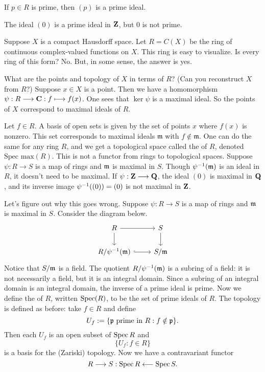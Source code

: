 \documentclass[11pt, oneside,margin=1in]{article}
\begin{document}
If $p\in R$ is prime, then $(p)$ is a prime ideal. 
\begin{example}
The ideal $(0)$ is a prime ideal in $\mathbf Z$, but $0$ is not prime.
\end{example}

Suppose $X$ is a compact Hausdorff space. Let $R=C(X)$ be the ring of continuous complex-valued functions on $X$. This ring is easy to visualize. Is every ring of this form? No. But, in some sense, the answer is yes. 

What are the points and topology of $X$ in terms of $R$? (Can you reconstruct $X$ from $R$?) Suppose $x\in X$ is a point. Then we have a homomorphism $\psi:R\longrightarrow \mathbf C: f\longmapsto f(x)$. One sees that $\ker \psi$ is a maximal ideal. So the points of $X$ correspond to maximal ideals of $R$. 

Let $f\in R$. A basis of open sets is given by the set of points $x$ where $f(x)$ is nonzero. This set corresponds to maximal ideals $\mathfrak{m}$ with $f\notin \mathfrak{m}$. One can do the same for any ring $R$, and we get a topological space called the  of $R$, denoted $\textrm{Spec max}(R)$. This is not a functor from rings to topological spaces. Suppose $\psi :R\longrightarrow S$ is a map of rings and $\mathfrak m$ is maximal in $S$. Though $\psi^{-1}(\mathfrak m)$ is an ideal in $R$, it doesn't need to be maximal. If $\psi:\mathbf Z\longrightarrow \mathbf Q$, the ideal $(0)$ is maximal in $\mathbf Q$, and its inverse image $\psi^{-1}((0))=(0)$ is not maximal in $\mathbf Z$.

Let's figure out why this goes wrong. Suppose $\psi:R\longrightarrow S$ is a map of rings and $\mathfrak m$ is maximal in $S$. Consider the diagram below.
\[
\begin{tikzcd}
R \arrow[r] \arrow[d]& S \arrow[d]\\
 R/\psi\inv(\mf m) \arrow[hookrightarrow]{r}& S/\mf m
\end{tikzcd}
\]
Notice that $S/\mathfrak m$ is a field. The quotient $R/\psi^{-1} (\mathfrak m)$ is a subring of a field: it is not necessarily a field, but it is an integral domain. Since a subring of an integral domain is an integral domain, the inverse of a prime ideal is prime. Now we define the  of $R$, written $\operatorname{Spec}(R)$, to be the set of prime ideals of $R$. The topology is defined as before: take $f\in R$ and define 
$$
U_f := \{ \mathfrak p \textrm{ prime in $R$} : f\notin \mathfrak p\}.
$$ 
Then each $U_f$ is an open subset of $\operatorname{Spec} R$ and 
$$
\{U_f : f\in R\}
$$
is a basis for the (Zariski) topology. Now we have a contravariant functor 
$$
R\longrightarrow S : \operatorname{Spec} R \longleftarrow \operatorname{Spec} S.
$$
\end{document}
